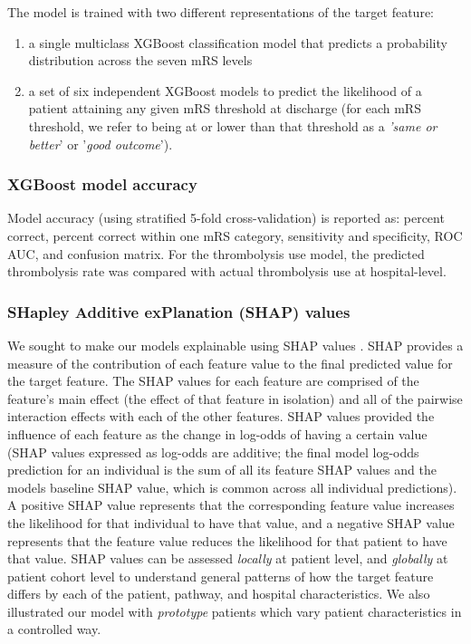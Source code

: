 The model is trained with two different representations of the target feature: 
\begin{enumerate}
    \item a single multiclass XGBoost classification model that predicts a probability distribution across the seven mRS levels
    \item a set of six independent XGBoost models to predict the likelihood of a patient attaining any given mRS threshold at discharge (for each mRS threshold, we refer to being at or lower than that threshold as a \textit{'same or better}' or '\textit{good outcome}'). 
\end{enumerate}

\subsubsection{XGBoost model accuracy}

Model accuracy (using stratified 5-fold cross-validation) is reported as: percent correct, percent correct within one mRS category, sensitivity and specificity, ROC AUC, and confusion matrix. For the thrombolysis use model, the predicted thrombolysis rate was compared with actual thrombolysis use at hospital-level.

\subsubsection{SHapley Additive exPlanation (SHAP) values}

We sought to make our models explainable using SHAP values \cite{lundberg_unified_2017}. SHAP provides a measure of the contribution of each feature value to the final predicted value for the target feature. The SHAP values for each feature are comprised of the feature’s main effect (the effect of that feature in isolation) and all of the pairwise interaction effects with each of the other features. SHAP values provided the influence of each feature as the change in log-odds of having a certain value (SHAP values expressed as log-odds are additive; the final model log-odds prediction for an individual is the sum of all its feature SHAP values and the models baseline SHAP value, which is common across all individual predictions). A positive SHAP value represents that the corresponding feature value increases the likelihood for that individual to have that value, and a negative SHAP value represents that the feature value reduces the likelihood for that patient to have that value. SHAP values can be assessed \textit{locally} at patient level, and \textit{globally} at patient cohort level to understand general patterns of how the target feature differs by each of the patient, pathway, and hospital characteristics. We also illustrated our model with \textit{prototype} patients which vary patient characteristics in a controlled way.

